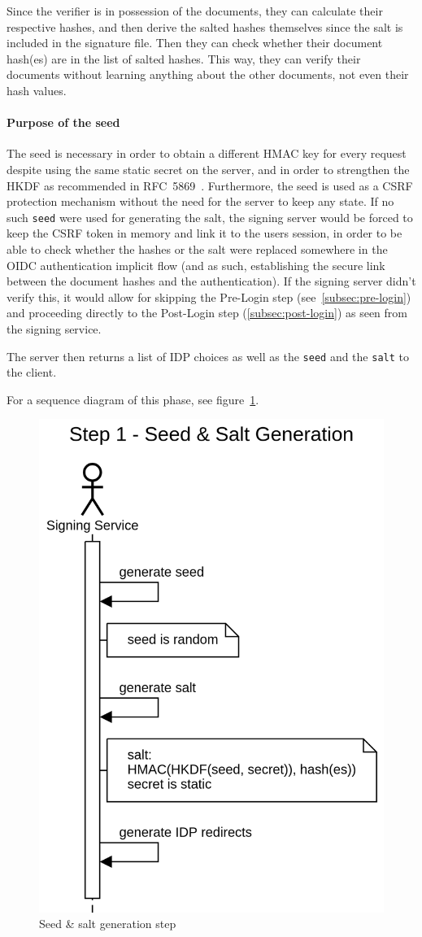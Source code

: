 Since the verifier is in possession of the documents, they can calculate their respective hashes,
and then derive the salted hashes themselves since the salt is included in the signature file.
Then they can check whether their document hash(es) are in the list of salted hashes.
This way, they can verify their documents without learning anything about the other documents,
not even their hash values.

\paragraph{Purpose of the seed}
The seed is necessary in order to obtain a different \gls{HMAC} key for every request
despite using the same static secret on the server,
and in order to strengthen the \gls{HKDF} as recommended in RFC~5869~\cite[Section 3.1]{rfc5869}.
Furthermore, the seed is used as a \gls{CSRF} protection mechanism without the need for the server to keep any state.
If no such \texttt{seed} were used for generating the salt,
the signing server would be forced to keep the \gls{CSRF} token in memory and link it to the users session,
in order to be able to check whether the hashes or the salt were replaced somewhere in the \gls{OIDC} authentication implicit flow
(and as such, establishing the secure link between the document hashes and the authentication).
If the signing server didn't verify this,
it would allow for skipping the Pre-Login step (see~\ref{subsec:pre-login})
and proceeding directly to the Post-Login step (\ref{subsec:post-login}) as seen from the signing service.

The server then returns a list of \gls{IDP} choices as well as the \texttt{seed} and the \texttt{salt} to the client.

For a sequence diagram of this phase, see figure~\ref{fig:seedgenerationstep}.

\begin{figure}[H]
    \begin{center}
        \includegraphics[width=0.35\linewidth]{images/protocol_step1_seed_generation.png}
        \caption{Seed \& salt generation step}
        \label{fig:seedgenerationstep}
    \end{center}
\end{figure}

